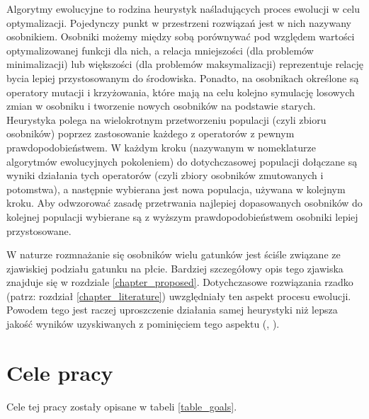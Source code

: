 \documentclass[twoside]{iisthesis}
\begin{document}
Algorytmy ewolucyjne to rodzina heurystyk naśladujących proces ewolucji w celu optymalizacji. Pojedynczy punkt w przestrzeni rozwiązań jest w nich nazywany osobnikiem. Osobniki możemy między sobą porównywać pod względem wartości optymalizowanej funkcji dla nich, a relacja mniejszości (dla problemów minimalizacji) lub większości (dla problemów maksymalizacji) reprezentuje relację bycia lepiej przystosowanym do środowiska. Ponadto, na osobnikach określone są operatory mutacji i krzyżowania, które mają na celu kolejno symulację losowych zmian w osobniku i tworzenie nowych osobników na podstawie starych. Heurystyka polega na wielokrotnym przetworzeniu populacji (czyli zbioru osobników) poprzez zastosowanie każdego z operatorów z pewnym prawdopodobieństwem. W każdym kroku (nazywanym w nomeklaturze algorytmów ewolucyjnych pokoleniem) do dotychczasowej populacji dołączane są wyniki działania tych operatorów (czyli zbiory osobników zmutowanych i potomstwa), a następnie wybierana jest nowa populacja, używana w kolejnym kroku. Aby odwzorować zasadę przetrwania najlepiej dopasowanych osobników do kolejnej populacji wybierane są z wyższym prawdopodobieństwem osobniki lepiej przystosowane.

W naturze rozmnażanie się osobników wielu gatunków jest ściśle związane ze zjawiskiej podziału gatunku na płcie. Bardziej szczegółowy opis tego zjawiska znajduje się w rozdziale \ref{chapter_proposed}. Dotychczasowe rozwiązania rzadko (patrz: rozdział \ref{chapter_literature}) uwzględniały ten aspekt procesu ewolucji. Powodem tego jest raczej uproszczenie działania samej heurystyki niż lepsza jakość wyników uzyskiwanych z pominięciem tego aspektu (\cite{GGA}, \cite{SexualGA}). 

\section{Cele pracy}

Cele tej pracy zostały opisane w tabeli \ref{table_goals}.

\FloatBarrier
\end{document}
